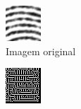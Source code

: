 \documentclass[10pt,a4paper]{article}
\begin{document}
\begin{figure}[!ht]
    \centering
    \begin{subfigure}[ht]{0.20\textwidth}
        \includegraphics[width=\textwidth]{2.jpg}
        \caption{Imagem original}
    \end{subfigure}
    \qquad
    \begin{subfigure}[ht]{0.20\textwidth}
        \includegraphics[width=\textwidth]{2_filtered_window_3.jpg}

\end{subfigure}
\end{figure}
\end{document}
